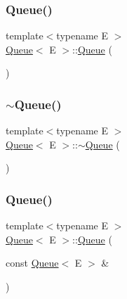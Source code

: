 \mbox{\label{class_queue_ab09891e54b51dc677ee6efb350687ae4}} 
\subsubsection{\texorpdfstring{Queue()}{Queue()}\hspace{0.1cm}{\footnotesize\ttfamily [3/6]}}
{\footnotesize\ttfamily template$<$typename E $>$ \\
\mbox{\hyperlink{class_queue}{Queue}}$<$ E $>$\+::\mbox{\hyperlink{class_queue}{Queue}} (\begin{DoxyParamCaption}{ }\end{DoxyParamCaption})\hspace{0.3cm}{\ttfamily [inline]}}

\mbox{\label{class_queue_a49fe82adb8dc2fb62ab53876a6933d0f}} 
\subsubsection{\texorpdfstring{$\sim$Queue()}{~Queue()}\hspace{0.1cm}{\footnotesize\ttfamily [2/3]}}
{\footnotesize\ttfamily template$<$typename E $>$ \\
\mbox{\hyperlink{class_queue}{Queue}}$<$ E $>$\+::$\sim$\mbox{\hyperlink{class_queue}{Queue}} (\begin{DoxyParamCaption}{ }\end{DoxyParamCaption})\hspace{0.3cm}{\ttfamily [inline]}}

\mbox{\label{class_queue_ac071ee553005a67737d35edeeaafca5b}} 
\subsubsection{\texorpdfstring{Queue()}{Queue()}\hspace{0.1cm}{\footnotesize\ttfamily [4/6]}}
{\footnotesize\ttfamily template$<$typename E $>$ \\
\mbox{\hyperlink{class_queue}{Queue}}$<$ E $>$\+::\mbox{\hyperlink{class_queue}{Queue}} (\begin{DoxyParamCaption}\item[{const \mbox{\hyperlink{class_queue}{Queue}}$<$ E $>$ \&}]{ }\end{DoxyParamCaption})\hspace{0.3cm}{\ttfamily [private]}}

